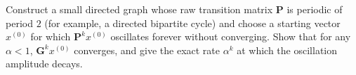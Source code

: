 \begin{exercise}
Construct a small directed graph whose raw transition matrix $\mathbf{P}$ is periodic of period $2$ (for example, a directed bipartite cycle) and choose a starting vector $x^{(0)}$ for which $\mathbf{P}^k x^{(0)}$ oscillates forever without converging. Show that for any $\alpha < 1$, $\mathbf{G}^k x^{(0)}$ converges, and give the exact rate $\alpha^k$ at which the oscillation amplitude decays.
\end{exercise}
